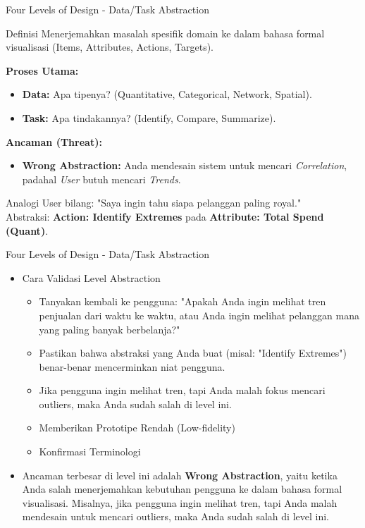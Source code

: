 \documentclass[t]{beamer}
\begin{document}
\begin{frame}{Four Levels of Design - Data/Task Abstraction}
\begin{block}{Definisi}
        Menerjemahkan masalah spesifik domain ke dalam bahasa formal visualisasi (Items, Attributes, Actions, Targets).
    \end{block}

    \textbf{Proses Utama:}
    \begin{itemize}
        \item \textbf{Data:} Apa tipenya? (Quantitative, Categorical, Network, Spatial).
        \item \textbf{Task:} Apa tindakannya? (Identify, Compare, Summarize).
    \end{itemize}

    \textbf{Ancaman (Threat):}
    \begin{itemize}
        \item \textbf{Wrong Abstraction:} Anda mendesain sistem untuk mencari \textit{Correlation}, padahal \textit{User} butuh mencari \textit{Trends}.
    \end{itemize}

    \begin{exampleblock}{Analogi}
        User bilang: "Saya ingin tahu siapa pelanggan paling royal." \\
        Abstraksi: \textbf{Action: Identify Extremes} pada \textbf{Attribute: Total Spend (Quant)}.
    \end{exampleblock}
\end{frame}

\begin{frame}{Four Levels of Design - Data/Task Abstraction}
	\begin{itemize}
		\item Cara Validasi Level Abstraction
		\begin{itemize}
			\item Tanyakan kembali ke pengguna: "Apakah Anda ingin melihat tren penjualan dari waktu ke waktu, atau Anda ingin melihat pelanggan mana yang paling banyak berbelanja?"
			\item Pastikan bahwa abstraksi yang Anda buat (misal: "Identify Extremes") benar-benar mencerminkan niat pengguna.
			\item Jika pengguna ingin melihat tren, tapi Anda malah fokus mencari outliers, maka Anda sudah salah di level ini.
			\item Memberikan Prototipe Rendah (Low-fidelity)
			\item Konfirmasi Terminologi
		\end{itemize}
		\item Ancaman terbesar di level ini adalah \textbf{Wrong Abstraction}, yaitu ketika Anda salah menerjemahkan kebutuhan pengguna ke dalam bahasa formal visualisasi. Misalnya, jika pengguna ingin melihat tren, tapi Anda malah mendesain untuk mencari outliers, maka Anda sudah salah di level ini.
	\end{itemize}
\end{frame}
\end{document}
